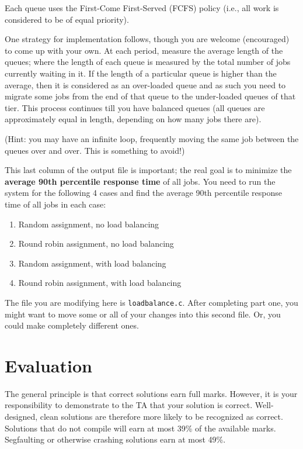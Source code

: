 \documentclass[letterpaper,10pt]{article}
\begin{document}
Each queue uses the First-Come First-Served (FCFS) policy (i.e., all work is considered to be of equal priority).

One strategy for implementation follows, though you are welcome (encouraged) to come up with your own. At each period, measure the average length of the queues; where the length of each queue is measured by the total number of jobs currently waiting in it. If the length of a particular queue is higher than the average, then it is considered as an over-loaded queue and as such you need to migrate some jobs from the end of that queue to the under-loaded queues of that tier. This process continues till you have balanced queues (all queues are approximately equal in length, depending on how many jobs there are).

(Hint: you may have an infinite loop, frequently moving the same job between the queues over and over. This is something to avoid!)

This last column of the output file is important; the real goal is to minimize the \textbf{average 90th percentile response time} of all jobs. You need to run the system for the following 4 cases and find the average 90th percentile response time of all jobs in each case:

\begin{enumerate}
	\item Random assignment, no load balancing
	\item Round robin assignment, no load balancing
	\item Random assignment, with load balancing
	\item Round robin assignment, with load balancing
\end{enumerate}

The file you are modifying here is \texttt{loadbalance.c}. After completing part one, you might want to move some or all of your changes into this second file. Or, you could make completely different ones.

\section*{Evaluation}

The general principle is that correct solutions earn full marks.
However, it is your responsibility to demonstrate to the TA
that your solution is correct. Well-designed, clean solutions 
are therefore more likely to be recognized as correct. Solutions that do not compile will earn at most 39\% of the available
marks. Segfaulting or otherwise crashing solutions earn
at most 49\%.
\end{document}
